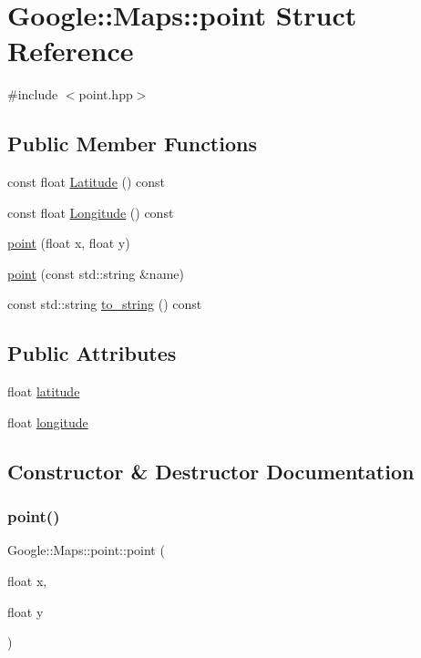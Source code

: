 \hypertarget{a00059}{}\section{Google\+:\+:Maps\+:\+:point Struct Reference}
\label{a00059}


{\ttfamily \#include $<$point.\+hpp$>$}

\subsection*{Public Member Functions}
\begin{DoxyCompactItemize}
\item 
const float \hyperlink{a00059_a4d2dcdbfa413c92d7a11fb7a280b5238}{Latitude} () const
\item 
const float \hyperlink{a00059_a0fd1c4ec3f383385b8981629e0acb188}{Longitude} () const
\item 
\hyperlink{a00059_abcf782dee7c73565e3db32b3d3d8c3f7}{point} (float x, float y)
\item 
\hyperlink{a00059_a5c633bface725d08067991fcfa0d0953}{point} (const std\+::string \&name)
\item 
const std\+::string \hyperlink{a00059_a9cc5bd886bee44b43dbaf9da0adb2ec3}{to\+\_\+string} () const
\end{DoxyCompactItemize}
\subsection*{Public Attributes}
\begin{DoxyCompactItemize}
\item 
float \hyperlink{a00059_af6b6537d2ea2525753d9e2f170fb2622}{latitude}
\item 
float \hyperlink{a00059_a488d9eb28fe2486d91173646ab620202}{longitude}
\end{DoxyCompactItemize}


\subsection{Constructor \& Destructor Documentation}
\mbox{\label{a00059_abcf782dee7c73565e3db32b3d3d8c3f7}} 
\subsubsection{\texorpdfstring{point()}{point()}\hspace{0.1cm}{\footnotesize\ttfamily [1/2]}}
{\footnotesize\ttfamily Google\+::\+Maps\+::point\+::point (\begin{DoxyParamCaption}\item[{float}]{x,  }\item[{float}]{y }\end{DoxyParamCaption})\hspace{0.3cm}{\ttfamily [inline]}}

